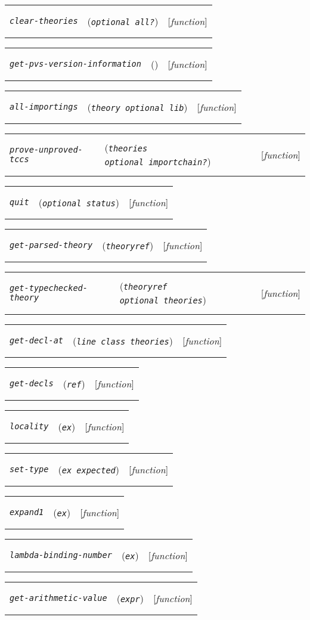 \documentclass[12pt]{book}
\makeatletter
\def\ampoptional{{\smaller\sc {\smaller\smaller \&}optional\ }}
\newenvironment{function}[3]%
{\par\noindent\begin{boxedminipage}{\textwidth}%
 \par\noindent\begin{tabularx}{\linewidth}{l>{\raggedright}Xr}%
 \functionhtgt{#1}&(\texttt{\textit{#2}})&[\emph{#3}]%
 \end{tabularx}\par\flushright\begin{minipage}{.97\textwidth}}
{\end{minipage}\end{boxedminipage}}
\newcommand{\functionnm}[1]{\texttt{\textit{#1}}}
\newcommand{\functionhtgt}[1]{\hypertarget{#1}{\functionnm{#1}}\index{#1@\functionnm{#1}|underline}}
\newenvironment{lispfunction}[2]%
{\begin{function}{#1}{#2}{function}}{\end{function}}
\makeatother
\begin{document}
\begin{lispfunction}{clear-theories}{\ampoptional all?}
\end{lispfunction}

\begin{lispfunction}{get-pvs-version-information}{}
\end{lispfunction}

\begin{lispfunction}{all-importings}{theory \ampoptional lib}
\end{lispfunction}

\begin{lispfunction}{prove-unproved-tccs}{theories \ampoptional importchain?}
\end{lispfunction}

\begin{lispfunction}{quit}{\ampoptional status}
\end{lispfunction}

\begin{lispfunction}{get-parsed-theory}{theoryref}
\end{lispfunction}

\begin{lispfunction}{get-typechecked-theory}{theoryref \ampoptional theories}
\end{lispfunction}

\begin{lispfunction}{get-decl-at}{line class theories}
\end{lispfunction}

\begin{lispfunction}{get-decls}{ref}
\end{lispfunction}

\begin{lispfunction}{locality}{ex}
\end{lispfunction}

\begin{lispfunction}{set-type}{ex expected}
\end{lispfunction}

\begin{lispfunction}{expand1}{ex}
\end{lispfunction}

\begin{lispfunction}{lambda-binding-number}{ex}
\end{lispfunction}

\begin{lispfunction}{get-arithmetic-value}{expr}
\end{lispfunction}
\end{document}
